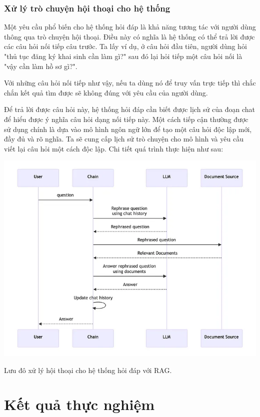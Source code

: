 \documentclass[a4paper, 12pt, openany]{book}
\begin{document}
\subsubsection{Xử lý trò chuyện hội thoại cho hệ thống}
Một yêu cầu phổ biến cho hệ thống hỏi đáp là khả năng tương tác với người dùng thông qua trò chuyện hội thoại. Điều này có nghĩa là hệ thống có thể trả lời được các 
câu hỏi nối tiếp câu trước. Ta lấy ví dụ, ở câu hỏi đầu tiên, người dùng hỏi "thủ tục đăng ký khai sinh cần làm gì?" sau đó lại hỏi tiếp
một câu hỏi nối là "vậy cần làm hồ sơ gì?".

Với những câu hỏi nối tiếp như vậy, nếu ta dùng nó để truy vấn trực tiếp thì chắc chắn kết quả tìm được sẽ không đúng với yêu cầu của người dùng.

Để trả lời được câu hỏi này, hệ thống hỏi đáp cần biết được lịch sử của đoạn chat để hiểu được ý nghĩa câu hỏi dạng nối tiếp này.
Một cách tiếp cận thường được sử dụng chính là dựa vào mô hình ngôn ngữ lớn để tạo một câu hỏi độc lập mới, đầy đủ và rõ nghĩa.
Ta sẽ cung cấp lịch sử trò chuyện cho mô hình và yêu cầu viết lại câu hỏi một cách độc lập. Chi tiết quá trình thực hiện như sau:

\vspace{0.5cm}
\begin{minipage}{\linewidth}
    \centering
    \includegraphics[width=\linewidth]{./assets/images/conversation.png}
    \captionsetup{type=figure}
    \caption{Lưu đô xử lý hội thoại cho hệ thống hỏi đáp với RAG.}
\end{minipage}

\section{Kết quả thực nghiệm}
\end{document}

